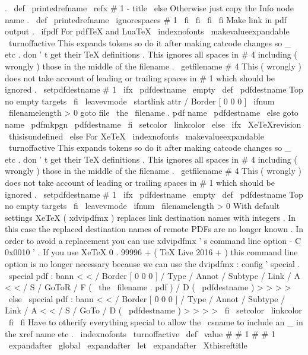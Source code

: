 {{{{{.
\
def
\
printedrefname
{
\
refx
{
#
1
-
title
}
{
}
}
%
\
else
%
Otherwise
just
copy
the
Info
node
name
.
\
def
\
printedrefname
{
\
ignorespaces
#
1
}
%
\
fi
%
\
fi
\
fi
\
fi
%
%
Make
link
in
pdf
output
.
\
ifpdf
%
For
pdfTeX
and
LuaTeX
{
\
indexnofonts
\
makevalueexpandable
\
turnoffactive
%
This
expands
tokens
so
do
it
after
making
catcode
changes
so
_
%
etc
.
don
'
t
get
their
TeX
definitions
.
This
ignores
all
spaces
in
%
#
4
including
(
wrongly
)
those
in
the
middle
of
the
filename
.
\
getfilename
{
#
4
}
%
%
%
This
(
wrongly
)
does
not
take
account
of
leading
or
trailing
%
spaces
in
#
1
which
should
be
ignored
.
\
setpdfdestname
{
#
1
}
%
%
\
ifx
\
pdfdestname
\
empty
\
def
\
pdfdestname
{
Top
}
%
no
empty
targets
\
fi
%
\
leavevmode
\
startlink
attr
{
/
Border
[
0
0
0
]
}
%
\
ifnum
\
filenamelength
>
0
goto
file
{
\
the
\
filename
.
pdf
}
name
{
\
pdfdestname
}
%
\
else
goto
name
{
\
pdfmkpgn
{
\
pdfdestname
}
}
%
\
fi
}
%
\
setcolor
{
\
linkcolor
}
%
\
else
\
ifx
\
XeTeXrevision
\
thisisundefined
\
else
%
For
XeTeX
{
\
indexnofonts
\
makevalueexpandable
\
turnoffactive
%
This
expands
tokens
so
do
it
after
making
catcode
changes
so
_
%
etc
.
don
'
t
get
their
TeX
definitions
.
This
ignores
all
spaces
in
%
#
4
including
(
wrongly
)
those
in
the
middle
of
the
filename
.
\
getfilename
{
#
4
}
%
%
%
This
(
wrongly
)
does
not
take
account
of
leading
or
trailing
%
spaces
in
#
1
which
should
be
ignored
.
\
setpdfdestname
{
#
1
}
%
%
\
ifx
\
pdfdestname
\
empty
\
def
\
pdfdestname
{
Top
}
%
no
empty
targets
\
fi
%
\
leavevmode
\
ifnum
\
filenamelength
>
0
%
With
default
settings
%
XeTeX
(
xdvipdfmx
)
replaces
link
destination
names
with
integers
.
%
In
this
case
the
replaced
destination
names
of
%
remote
PDFs
are
no
longer
known
.
In
order
to
avoid
a
replacement
%
you
can
use
xdvipdfmx
'
s
command
line
option
-
C
0x0010
'
.
%
If
you
use
XeTeX
0
.
99996
+
(
TeX
Live
2016
+
)
%
this
command
line
option
is
no
longer
necessary
%
because
we
can
use
the
dvipdfmx
:
config
'
special
.
\
special
{
pdf
:
bann
<
<
/
Border
[
0
0
0
]
/
Type
/
Annot
/
Subtype
/
Link
/
A
<
<
/
S
/
GoToR
/
F
(
\
the
\
filename
.
pdf
)
/
D
(
\
pdfdestname
)
>
>
>
>
}
%
\
else
\
special
{
pdf
:
bann
<
<
/
Border
[
0
0
0
]
/
Type
/
Annot
/
Subtype
/
Link
/
A
<
<
/
S
/
GoTo
/
D
(
\
pdfdestname
)
>
>
>
>
}
%
\
fi
}
%
\
setcolor
{
\
linkcolor
}
%
\
fi
\
fi
{
%
%
Have
to
otherify
everything
special
to
allow
the
\
csname
to
%
include
an
_
in
the
xref
name
etc
.
\
indexnofonts
\
turnoffactive
\
def
\
value
#
#
1
{
#
#
1
}
%
\
expandafter
\
global
\
expandafter
\
let
\
expandafter
\
Xthisreftitle
}}}}}}
